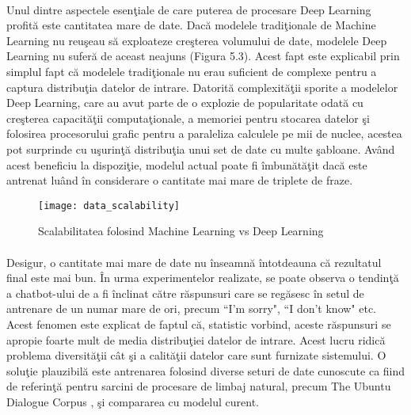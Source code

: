 \paragraph{}
Unul dintre aspectele esen\c tiale de care puterea de procesare Deep Learning profit\u a este cantitatea mare de date. Dac\u a modelele tradi\c tionale de Machine Learning nu reu\c seau s\u a exploateze cre\c sterea volumului de date, modelele Deep Learning nu sufer\u a de aceast neajuns (Figura 5.3). Acest fapt este explicabil prin simplul fapt c\u a modelele tradi\c tionale nu erau suficient de complexe pentru a captura distribu\c tia datelor de intrare. Datorit\u a complexit\u a\c tii sporite a modelelor Deep Learning, care au avut parte de o explozie de popularitate odat\u a cu cre\c sterea capacit\u a\c tii computa\c tionale, a memoriei pentru stocarea datelor \c si folosirea procesorului grafic pentru a paraleliza calculele pe mii de nuclee, acestea pot surprinde cu u\c surin\c t\u a distribu\c tia unui set de date cu multe \c sabloane. Av\^ and acest beneficiu la dispozi\c tie, modelul actual poate fi \^ imbun\u at\u a\c tit dac\u a este antrenat lu\^ and \^ in considerare o cantitate mai mare de triplete de fraze.

\begin{figure}[H]
\centering
\texttt{[image: data\_scalability]}
\caption{Scalabilitatea folosind Machine Learning vs Deep Learning}
\end{figure}

\paragraph{}
Desigur, o cantitate mai mare de date nu \^ inseamn\u a \^ intotdeauna c\u a rezultatul final este mai bun. \^ In urma experimentelor realizate, se poate observa o tendin\c t\u a a chatbot-ului de a fi \^ inclinat c\u atre r\u aspunsuri care se reg\u asesc \^ in setul de antrenare de un numar mare de ori, precum ``I'm sorry", ``I don't know" etc. Acest fenomen este explicat de faptul c\u a, statistic vorbind, aceste r\u aspunsuri se apropie foarte mult de media distribu\c tiei datelor de intrare. Acest lucru ridic\u a problema diversit\u a\c tii c\^ at \c si a calit\u a\c tii datelor care sunt furnizate sistemului. O solu\c tie plauzibil\u a este antrenarea folosind diverse seturi de date cunoscute ca fiind de referin\c t\u a pentru sarcini de procesare de limbaj natural, precum The Ubuntu Dialogue Corpus \cite{DBLP:journals/corr/LowePSP15}, \c si compararea cu modelul curent.




